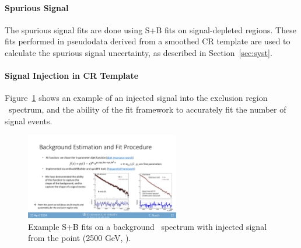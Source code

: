 \paragraph{Spurious Signal}

The spurious signal fits are done using S+B fits on signal-depleted regions. 
These fits performed in pseudodata derived from a smoothed CR template are used to calculate the spurious signal uncertainty, as described in Section~\ref{sec:syst}.

\clearpage


\paragraph{Signal Injection in CR Template}

Figure~\ref{fig:splusb_sigInj} shows an example of an injected signal into the exclusion region \mt~spectrum, and the ability of the fit framework to accurately fit the number of signal events.
\begin{figure}[!htbp]
\centering
   \includegraphics[width=0.6\textwidth]{figures/stats/splusb_sigInj}
    \caption{Example S+B fits on a background \mt~spectrum with injected signal from the point (2500 GeV, ).
    \label{fig:splusb_sigInj}}
\end{figure}

